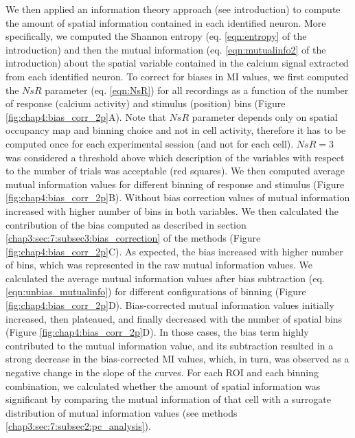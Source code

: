 We then applied an information theory approach (see introduction) to compute the amount of spatial information contained in each identified neuron. 
More specifically, we computed the Shannon entropy (eq. \ref{eqn:entropy} of the introduction) and then the mutual information (eq. \ref{eqn:mutualinfo2} of the introduction) about the spatial variable contained in the calcium signal extracted from each identified neuron.
To correct for biases in MI values, we first computed the $NsR$ parameter (eq. \ref{eqn:NsR}) for all recordings as a function of the number of response (calcium activity) and stimulus (position) bins (Figure \ref{fig:chap4:bias_corr_2p}A).
Note that $NsR$ parameter depends only on spatial occupancy map and binning choice and not in cell activity, therefore it has to be computed once for each experimental session (and not for each cell).
$NsR=3$ was considered a threshold above which description of the variables with respect to the number of trials was acceptable (red squares).
We then computed average mutual information values for different binning of response and stimulus (Figure \ref{fig:chap4:bias_corr_2p}B).
Without bias correction values of mutual information increased with higher number of bins in both variables.
We then calculated the contribution of the bias computed as described in section \ref{chap3:sec:7:subsec3:bias_correction} of the methods (Figure \ref{fig:chap4:bias_corr_2p}C).
As expected, the bias increased with higher number of bins, which was represented in the raw mutual information values.
We calculated the average mutual information values after bias subtraction (eq. \ref{eqn:unbias_mutualinfo}) for different configurations of binning (Figure \ref{fig:chap4:bias_corr_2p}D).
Bias-corrected mutual information values initially increased, then plateaued, and finally decreased with the number of spatial bins (Figure \ref{fig:chap4:bias_corr_2p}D). 
In those cases, the bias term highly contributed to the mutual information value, and its subtraction resulted in a strong decrease in the bias-corrected MI values, which, in turn, was observed as a negative change in the slope of the curves.
For each ROI and each binning combination, we calculated whether the amount of spatial information was significant by comparing the mutual information of that cell with a surrogate distribution of mutual information values (see methods \ref{chap3:sec:7:subsec2:pc_analysis}).
